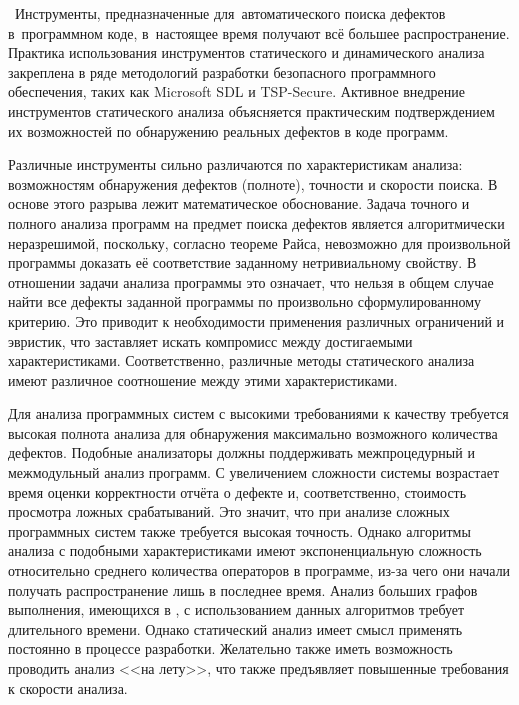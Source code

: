\actuality\
Инструменты, предназначенные для~автоматического поиска дефектов в~программном коде, в~настоящее время получают всё большее распространение. Практика использования инструментов статического и динамического анализа закреплена в ряде методологий разработки безопасного программного обеспечения, таких как Microsoft SDL и TSP-Secure. Активное внедрение инструментов статического анализа объясняется практическим подтверждением их возможностей по обнаружению реальных дефектов в коде программ. 

Различные инструменты сильно различаются по характеристикам анализа: возможностям обнаружения дефектов (полноте), точности и скорости поиска. В основе этого разрыва лежит математическое обоснование. Задача точного и полного анализа программ на предмет поиска дефектов является алгоритмически неразрешимой, поскольку, согласно теореме Райса, невозможно для произвольной программы доказать её соответствие заданному нетривиальному свойству. В отношении задачи анализа программы это означает, что нельзя в общем случае найти все дефекты заданной программы по произвольно сформулированному критерию. Это приводит к необходимости применения различных ограничений и эвристик, что заставляет искать компромисс между достигаемыми характеристиками. Соответственно, различные методы статического анализа имеют различное соотношение между этими характеристиками. %


Для анализа программных систем с высокими требованиями к качеству требуется высокая полнота анализа для обнаружения максимально возможного количества дефектов. Подобные анализаторы должны поддерживать межпроцедурный и межмодульный анализ программ. С увеличением сложности системы возрастает время оценки корректности отчёта о дефекте и, соответственно, стоимость просмотра ложных срабатываний. Это значит, что при анализе сложных программных систем также требуется высокая точность. Однако алгоритмы анализа с подобными характеристиками имеют экспоненциальную сложность относительно среднего количества операторов в программе, из-за чего они начали получать распространение лишь в последнее время. Анализ больших графов выполнения, имеющихся в , с использованием данных алгоритмов требует длительного времени. Однако статический анализ имеет смысл применять постоянно в процессе разработки. Желательно также иметь возможность проводить анализ <<на лету>>, что также предъявляет повышенные требования к скорости анализа.

